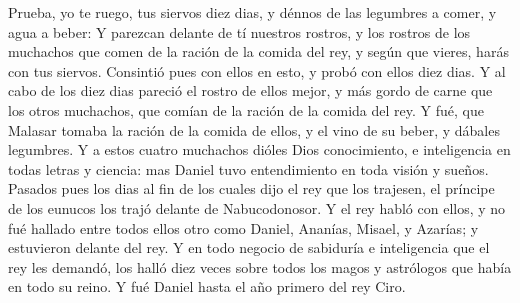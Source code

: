 \bverse Prueba, yo te ruego, tus siervos diez dias, y dénnos de las legumbres a comer, y agua a beber:
\bverse Y parezcan delante de tí nuestros rostros, y los rostros de los muchachos que comen de la ración de la comida del rey, y según que vieres, harás con tus siervos.
\bverse Consintió pues con ellos en esto, y probó con ellos diez dias.
\bverse Y al cabo de los diez dias pareció el rostro de ellos mejor, y más gordo de carne que los otros muchachos, que comían de la ración de la comida del rey.
\bverse Y fué, que Malasar tomaba la ración de la comida de ellos, y el vino de su beber, y dábales legumbres.
\bverse Y a estos cuatro muchachos dióles Dios conocimiento, e inteligencia en todas letras y ciencia: mas Daniel tuvo entendimiento en toda visión y sueños.
\bverse Pasados pues los dias al fin de los cuales dijo el rey que los trajesen, el príncipe de los eunucos los trajó delante de Nabucodonosor.
\bverse Y el rey habló con ellos, y no fué hallado entre todos ellos otro como Daniel, Ananías, Misael, y Azarías; y estuvieron delante del rey.
\bverse Y en todo negocio de sabiduría e inteligencia que el rey les demandó, los halló diez veces sobre todos los magos y astrólogos que había en todo su reino.
\bverse Y fué Daniel hasta el año primero del rey Ciro.


\addtocounter{footnotemain}{1}

\marginnotes{-16.3cm}{
}


\marginnotes{-23.5cm}{
}

\noindent

